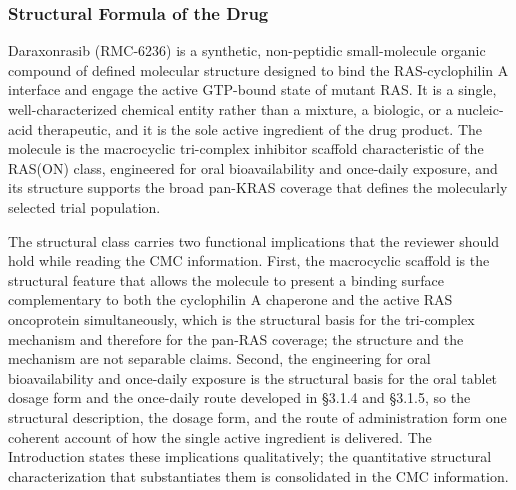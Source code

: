 \subsubsection{Structural Formula of the Drug}

Daraxonrasib (RMC-6236) is a synthetic, non-peptidic small-molecule organic
compound of defined molecular structure designed to bind the RAS-cyclophilin A
interface and engage the active GTP-bound state of mutant RAS. It is a single,
well-characterized chemical entity rather than a mixture, a biologic, or a
nucleic-acid therapeutic, and it is the sole active ingredient of the drug product.
The molecule is the macrocyclic tri-complex inhibitor scaffold characteristic of
the RAS(ON) class, engineered for oral bioavailability and once-daily exposure, and
its structure supports the broad pan-KRAS coverage that defines the molecularly
selected trial population.

The structural class carries two functional implications that the reviewer should
hold while reading the CMC information. First, the macrocyclic scaffold is the
structural feature that allows the molecule to present a binding surface complementary
to both the cyclophilin A chaperone and the active RAS oncoprotein simultaneously,
which is the structural basis for the tri-complex mechanism and therefore for the
pan-RAS coverage; the structure and the mechanism are not separable claims. Second,
the engineering for oral bioavailability and once-daily exposure is the structural
basis for the oral tablet dosage form and the once-daily route developed in
\S 3.1.4 and \S 3.1.5, so the structural description, the dosage form, and the route
of administration form one coherent account of how the single active ingredient is
delivered. The Introduction states these implications qualitatively; the
quantitative structural characterization that substantiates them is consolidated in
the CMC information.

\clearpage


